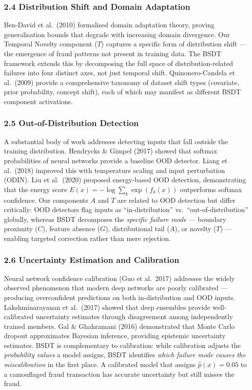 \documentclass[
  11pt,
]{article}
\newcounter{none} %
\begin{document}
\subsubsection{2.4 Distribution Shift and Domain
Adaptation}\label{distribution-shift-and-domain-adaptation}

Ben-David et al.~(2010) formalised domain adaptation theory, proving
generalisation bounds that degrade with increasing domain divergence.
Our Temporal Novelty component (\(T\)) captures a specific form of
distribution shift — the emergence of fraud patterns not present in
training data. The BSDT framework extends this by decomposing the full
space of distribution-related failures into four distinct axes, not just
temporal shift. Quinonero-Candela et al.~(2009) provide a comprehensive
taxonomy of dataset shift types (covariate, prior probability, concept
shift), each of which may manifest as different BSDT component
activations.

\subsubsection{2.5 Out-of-Distribution
Detection}\label{out-of-distribution-detection}

A substantial body of work addresses detecting inputs that fall outside
the training distribution. Hendrycks \& Gimpel (2017) showed that
softmax probabilities of neural networks provide a baseline OOD
detector. Liang et al.~(2018) improved this with temperature scaling and
input perturbation (ODIN). Liu et al.~(2020) proposed energy-based OOD
detection, demonstrating that the energy score
\(E(x) = -\log \sum_k \exp(f_k(x))\) outperforms softmax confidence. Our
components \(A\) and \(T\) are related to OOD detection but differ
critically: OOD detectors flag inputs as “in-distribution”
vs.~“out-of-distribution” globally, whereas BSDT decomposes the
\emph{specific failure mode} — boundary proximity (\(C\)), feature
absence (\(G\)), distributional tail (\(A\)), or novelty (\(T\)) —
enabling targeted correction rather than mere rejection.

\subsubsection{2.6 Uncertainty Estimation and
Calibration}\label{uncertainty-estimation-and-calibration}

Neural network confidence calibration (Guo et al.~2017) addresses the
widely observed phenomenon that modern deep networks are poorly
calibrated — producing overconfident predictions on both in-distribution
and OOD inputs. Lakshminarayanan et al.~(2017) showed that deep
ensembles provide well-calibrated uncertainty estimates through
disagreement among independently trained members. Gal \& Ghahramani
(2016) demonstrated that Monte Carlo dropout approximates Bayesian
inference, providing epistemic uncertainty estimates. BSDT is
complementary to calibration: while calibration adjusts the
\emph{probability values} a model assigns, BSDT identifies \emph{which
failure mode causes the miscalibration} in the first place. A calibrated
model that assigns \(\hat{p}(x) = 0.05\) to a camouflaged fraud
transaction has accurate uncertainty but still misses the fraud.
\end{document}
